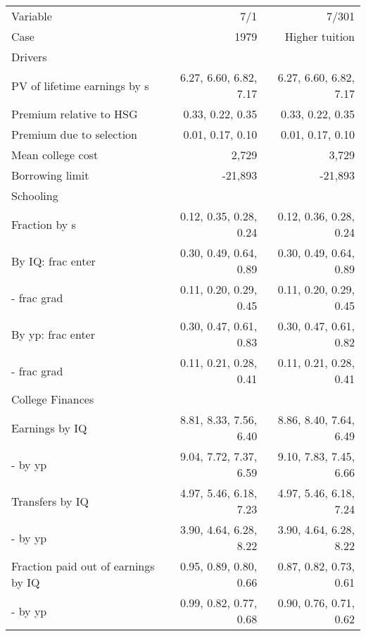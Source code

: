 \begin{tabular}{lrr}
\hline
Variable & 7/1  & 7/301  \\ 
Case & 1979  & Higher tuition  \\ 
Drivers &   &   \\ 
PV of lifetime earnings by s & 6.27, 6.60, 6.82, 7.17  & 6.27, 6.60, 6.82, 7.17  \\ 
Premium relative to HSG & 0.33, 0.22, 0.35  & 0.33, 0.22, 0.35  \\ 
Premium due to selection & 0.01, 0.17, 0.10  & 0.01, 0.17, 0.10  \\ 
Mean college cost & 2,729  & 3,729  \\ 
Borrowing limit & -21,893  & -21,893  \\ 
\hline
Schooling &   &   \\ 
Fraction by s & 0.12, 0.35, 0.28, 0.24  & 0.12, 0.36, 0.28, 0.24  \\ 
By IQ: frac enter & 0.30, 0.49, 0.64, 0.89  & 0.30, 0.49, 0.64, 0.89  \\ 
- frac grad & 0.11, 0.20, 0.29, 0.45  & 0.11, 0.20, 0.29, 0.45  \\ 
By yp: frac enter & 0.30, 0.47, 0.61, 0.83  & 0.30, 0.47, 0.61, 0.82  \\ 
- frac grad & 0.11, 0.21, 0.28, 0.41  & 0.11, 0.21, 0.28, 0.41  \\ 
\hline
College Finances &   &   \\ 
Earnings by IQ & 8.81, 8.33, 7.56, 6.40  & 8.86, 8.40, 7.64, 6.49  \\ 
- by yp & 9.04, 7.72, 7.37, 6.59  & 9.10, 7.83, 7.45, 6.66  \\ 
Transfers by IQ & 4.97, 5.46, 6.18, 7.23  & 4.97, 5.46, 6.18, 7.24  \\ 
- by yp & 3.90, 4.64, 6.28, 8.22  & 3.90, 4.64, 6.28, 8.22  \\ 
Fraction paid out of earnings by IQ & 0.95, 0.89, 0.80, 0.66  & 0.87, 0.82, 0.73, 0.61  \\ 
- by yp & 0.99, 0.82, 0.77, 0.68  & 0.90, 0.76, 0.71, 0.62  \\ 
\hline
\end{tabular}%
